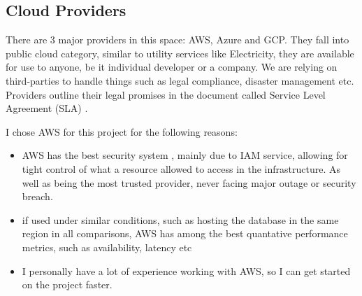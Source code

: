 \subsection{Cloud Providers}
There are 3 major providers in this space: AWS, Azure and GCP. They fall into public cloud category, similar to utility services like Electricity, they are available for use to anyone, be it individual developer or a company. We are relying on third-parties to handle things such as legal compliance, disaster management etc. Providers outline their legal promises in the document called Service Level Agreement (SLA) \cite{cloudSLA}.

I chose AWS for this project for the following reasons:
\begin{itemize}
    \item{AWS has the best security system \cite{Narula2015Cloud}, mainly due to IAM service, allowing for tight control of what a resource allowed to access in the infrastructure. As well as being the most trusted provider, never facing major outage or security breach. }
    \item{if used under similar conditions, such as hosting the database in the same region in all comparisons, AWS has among the best quantative performance metrics, such as availability, latency etc \cite{CloudMetrics}  }
    \item {I personally have a lot of experience working with AWS, so I can get started on the project faster.}
\end{itemize}
